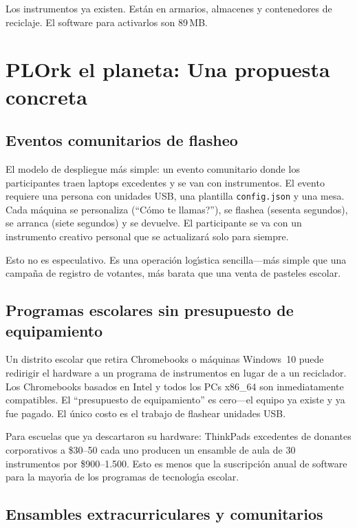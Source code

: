 \documentclass[10pt,letterpaper,twocolumn]{article}
\begin{document}
Los instrumentos ya existen. Est\'{a}n en armarios, almacenes y contenedores de reciclaje. El software para activarlos son 89\,MB.


\section{PLOrk el planeta: Una propuesta concreta}
\label{sec:proposal}

\subsection{Eventos comunitarios de flasheo}

El modelo de despliegue m\'{a}s simple: un evento comunitario donde los participantes traen laptops excedentes y se van con instrumentos. El evento requiere una persona con unidades USB, una plantilla \texttt{config.json} y una mesa. Cada m\'{a}quina se personaliza (``\textquestiondown C\'{o}mo te llamas?''), se flashea (sesenta segundos), se arranca (siete segundos) y se devuelve. El participante se va con un instrumento creativo personal que se actualizar\'{a} solo para siempre.

Esto no es especulativo. Es una operaci\'{o}n log\'{\i}stica sencilla---m\'{a}s simple que una campa\~{n}a de registro de votantes, m\'{a}s barata que una venta de pasteles escolar.

\subsection{Programas escolares sin presupuesto de equipamiento}

Un distrito escolar que retira Chromebooks o m\'{a}quinas Windows~10 puede redirigir el hardware a un programa de instrumentos en lugar de a un reciclador. Los Chromebooks basados en Intel y todos los PCs x86\_64 son inmediatamente compatibles. El ``presupuesto de equipamiento'' es cero---el equipo ya existe y ya fue pagado. El \'{u}nico costo es el trabajo de flashear unidades USB.

Para escuelas que ya descartaron su hardware: ThinkPads excedentes de donantes corporativos a \$30--50 cada uno producen un ensamble de aula de 30 instrumentos por \$900--1.500. Esto es menos que la suscripci\'{o}n anual de software para la mayor\'{\i}a de los programas de tecnolog\'{\i}a escolar.

\subsection{Ensambles extracurriculares y comunitarios}
\end{document}
